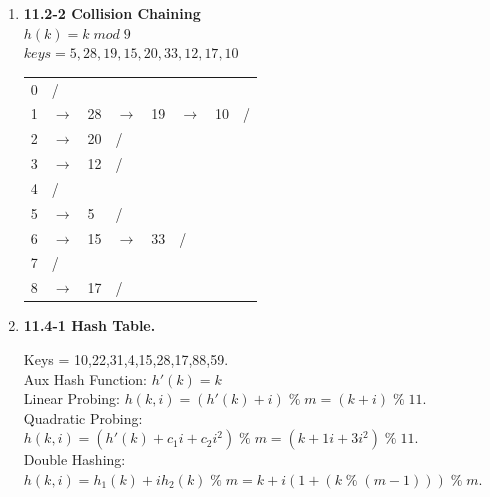 \documentclass{article}
\begin{document}
\begin{enumerate}
    \item \textbf{11.2-2 Collision Chaining} \\
    
    $h(k) = k\;mod\;9$ \\
    $keys = 5, 28, 19, 15, 20, 33, 12, 17, 10$ \\

    \begin{table}[H]
      \begin{tabular}{l|l|llllll}
      \cline{2-2}
      0 & / & & & & & &  \\ \cline{2-8} 
      1 & $\rightarrow$ & \multicolumn{1}{l|}{28} & \multicolumn{1}{l|}{$\rightarrow$} & \multicolumn{1}{l|}{19} & \multicolumn{1}{l|}{$\rightarrow$} & \multicolumn{1}{l|}{10} & \multicolumn{1}{l|}{/} \\ \cline{2-8} 
      2 & $\rightarrow$ & \multicolumn{1}{l|}{20} & \multicolumn{1}{l|}{/}& & & &  \\ \cline{2-4}
      3 & $\rightarrow$ & \multicolumn{1}{l|}{12} & \multicolumn{1}{l|}{/}& & & &  \\ \cline{2-4}
      4 & / & & & & & &  \\ \cline{2-4}
      5 & $\rightarrow$ & \multicolumn{1}{l|}{5}  & \multicolumn{1}{l|}{/}& & & &  \\ \cline{2-6}
      6 & $\rightarrow$ & \multicolumn{1}{l|}{15} & \multicolumn{1}{l|}{$\rightarrow$} & \multicolumn{1}{l|}{33} & \multicolumn{1}{l|}{/}& &  \\ \cline{2-6}
      7 & / & & & & & &  \\ \cline{2-4}
      8 & $\rightarrow$ & \multicolumn{1}{l|}{17} & \multicolumn{1}{l|}{/}& & & &  \\ \cline{2-4}
      \end{tabular}
      \end{table}
    
    \item \textbf{11.4-1 Hash Table.}
    
    Keys = 10,22,31,4,15,28,17,88,59. \\
    Aux Hash Function: $h'(k) = k$ \\
    Linear Probing: $h(k,i) = (h'(k) + i)\;\%\;m = (k + i)\;\%\;11$. \\
    Quadratic Probing: $h(k,i) = (h'(k) + c_1i + c_2i^2)\;\%\;m = (k + 1i + 3i^2)\;\%\;11$. \\
    Double Hashing: $h(k,i) = h_1(k) + ih_2(k)\;\%\;m = k + i(1 + (k\;\%\;(m - 1)))\;\%\;m$. \\
    

\end{enumerate}
\end{document}
